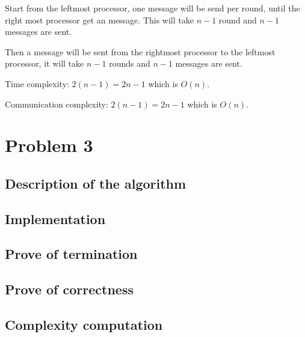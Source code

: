 \documentclass[paper=a4, fontsize=11pt]{scrartcl} %
\numberwithin{equation}{section} %
\numberwithin{figure}{section} %
\numberwithin{table}{section} %
\begin{document}
Start from the leftmost processor, one message will be send per round, until the right most processor get an message. This will take $n - 1$ round and $n - 1$ messages are sent.

Then a message will be sent from the rightmost processor to the leftmost processor, it will take $n - 1$ rounds and $n - 1$ messages are sent.

Time complexity: $2(n - 1) = 2n - 1$ which is $O(n)$.

Communication complexity:  $2(n - 1) = 2n - 1$ which is $O(n)$.

\section*{Problem 3}
\subsection*{Description of the algorithm}
\subsection*{Implementation}
\subsection*{Prove of termination}
\subsection*{Prove of correctness}
\subsection*{Complexity computation}
\end{document}
